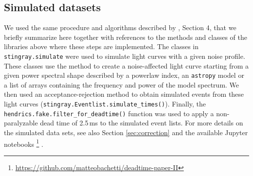 \documentclass[twocolumn]{aastex61}
\begin{document}
\subsection{Simulated datasets}
We used the same procedure and algorithms described by \citet{Bachetti+15}, Section 4, that we briefly summarize here together with references to the methods and classes of the libraries above where these steps are implemented.
The classes in \texttt{stingray.simulate} were used to simulate light curves with a given noise profile. 
These classes use the \citet{timmer1995} method to create a noise-affected light curve starting from a given power spectral shape described by a powerlaw index, an \texttt{astropy} model or a list of arrays containing the frequency and power of the model spectrum.
We then used an acceptance-rejection method to obtain simulated events from these light curves (\texttt{stingray.Eventlist.simulate\_times()}). 
Finally, the \texttt{hendrics.fake.filter\_for\_deadtime()} function was used to apply a non-paralyzable dead time of 2.5\,ms to the simulated event lists. For more details on the simulated data sets, see also Section \ref{sec:correction} and the available Jupyter notebooks%
\footnote{\href{https://github.com/matteobachetti/deadtime-paper-II}{https://github.com/matteobachetti/deadtime-paper-II}} \citep[for a description of Jupyter notebooks, see][]{kluyver2016jupyter}.
\end{document}
